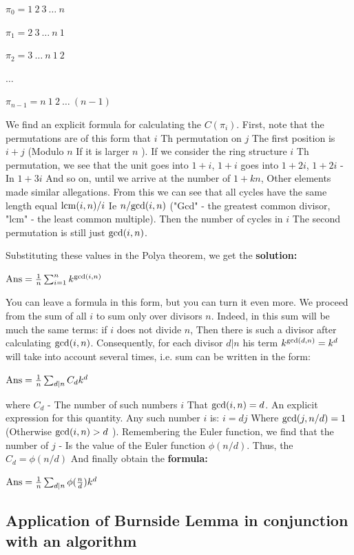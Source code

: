 $\pi_0 =1\ 2\ 3\ \ldots\ n$

$\pi_1 = 2\ 3\ \ldots\ n\ 1$

$\pi_2 = 3\ \ldots\ n\ 1\ 2$

$\ldots$

$\pi_ {n-1} = n\ 1\ 2\ \ldots\ (n-1)$

We find an explicit formula for calculating the $C (\pi_i)$. First, note that the permutations are of this form that $i$ Th permutation on $j$ The first position is $i + j$ (Modulo $n$ If it is larger $n$ ). If we consider the ring structure $i$ Th permutation, we see that the unit goes into $1 + i$, $1 + i$ goes into $1 +2 i$, $1 +2 i$ - In $1 +3 i$ And so on, until we arrive at the number of $1 + kn$, Other elements made similar allegations. From this we can see that all cycles have the same length equal ${\rm lcm} (i, n) / i$ Ie $n / {\rm gcd} (i, n)$ ("Gcd" - the greatest common divisor, "lcm" - the least common multiple). Then the number of cycles in $i$ The second permutation is still just ${\rm gcd} (i, n)$.

Substituting these values ​​in the Polya theorem, we get the \textbf{solution:}

${\rm Ans}=\frac{1}{n}\sum_{i=1}^{n}k^{\gcd(i,n)}$

You can leave a formula in this form, but you can turn it even more. We proceed from the sum of all $i$ to sum only over divisors $n$. Indeed, in this sum will be much the same terms: if $i$ does not divide $n$, Then there is such a divisor after calculating ${\rm gcd} (i, n)$. Consequently, for each divisor $d | n$ his term $k ^ {{\rm gcd} (d, n)} = k ^ d$ will take into account several times, i.e. sum can be written in the form:

${\rm Ans} = \frac {1} {n} \sum_ {d | n} C_d k ^ d$

where $C_d$ - The number of such numbers $i$ That ${\rm gcd} (i, n) = d$. An explicit expression for this quantity. Any such number $i$ is: $i = dj$ Where ${\rm gcd} (j, n / d) = 1$ (Otherwise ${\rm gcd} (i, n)> d$ ). Remembering the Euler function, we find that the number of $j$ - Is the value of the Euler function $\phi (n / d)$. Thus, the $C_d = \phi (n / d)$ And finally obtain the \textbf{formula:}

${\rm Ans}=\frac{1}{n}\sum_{d|n}\phi(\frac{n}{d})k^{d}$

\subsection{ Application of Burnside Lemma in conjunction with an algorithm }

